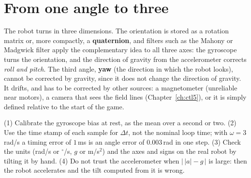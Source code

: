 \section*{From one angle to three}
The robot turns in three dimensions. The orientation is stored as a rotation matrix or, more compactly, a \textbf{quaternion}, and filters such as the Mahony or Madgwick filter apply the complementary idea to all three axes: the gyroscope turns the orientation, and the direction of gravity from the accelerometer corrects \emph{roll and pitch}. The third angle, \textbf{yaw} (the direction in which the robot looks), cannot be corrected by gravity, since it does not change the direction of gravity. It drifts, and has to be corrected by other sources: a magnetometer (unreliable near motors), a camera that sees the field lines (Chapter~\ref{ch:ctl5}), or it is simply defined relative to the start of the game.

\begin{keyidea}
(1) Calibrate the gyroscope bias at rest, as the mean over a second or two. (2) Use the time stamp of each sample for $\Delta t$, not the nominal loop time; with $\omega=3$\,rad/s a timing error of $1$\,ms is an angle error of $0.003$\,rad in one step. (3) Check the units (rad/s or $^{\circ}$/s, $g$ or m/s$^2$) and the axes and signs on the real robot by tilting it by hand. (4) Do not trust the accelerometer when $\bigl|\,|a|-g\,\bigr|$ is large: then the robot accelerates and the tilt computed from it is wrong.
\end{keyidea}

